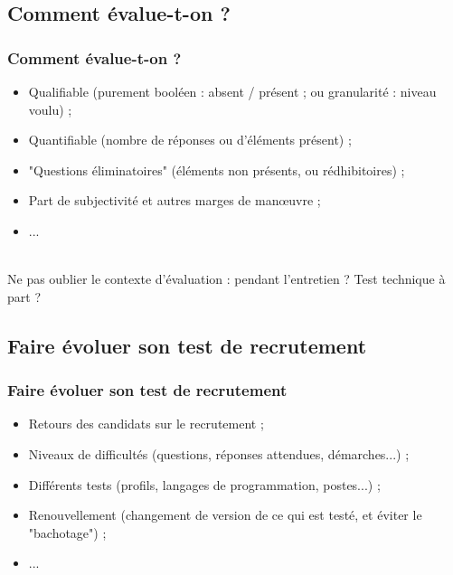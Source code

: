 \documentclass{beamer}
\begin{document}
\subsection{Comment {\'e}value-t-on ?}
\begin{frame}
	\frametitle{Comment {\'e}value-t-on ?}
	\begin{itemize}
		\item Qualifiable (purement bool{\'e}en : absent / pr{\'e}sent ; ou granularit{\'e} : niveau voulu) ; 
		\item Quantifiable (nombre de r{\'e}ponses ou d'{\'e}l{\'e}ments pr{\'e}sent) ; 
		\item "Questions {\'e}liminatoires" ({\'e}l{\'e}ments non pr{\'e}sents, ou r{\'e}dhibitoires) ; 
		\item Part de subjectivit{\'e} et autres marges de man\oe uvre ; 
		\item ... 
	\end{itemize}~\\
	
	Ne pas oublier le contexte d'{\'e}valuation : pendant l'entretien ? Test technique {\`a} part ?
\end{frame}

\subsection{Faire {\'e}voluer son test de recrutement}
\begin{frame}
	\frametitle{Faire {\'e}voluer son test de recrutement}
	\begin{itemize}
		\item Retours des candidats sur le recrutement ; 
		\item Niveaux de difficult{\'e}s (questions, r{\'e}ponses attendues, d{\'e}marches...) ; 
		\item Diff{\'e}rents tests (profils, langages de programmation, postes...) ; 
		\item Renouvellement (changement de version de ce qui est test{\'e}, et {\'e}viter le "bachotage") ; 
		\item ... 
	\end{itemize}~\\
	
\end{frame} 
\end{document}
